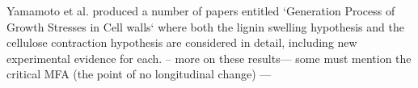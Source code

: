 Yamamoto et al. produced a number of papers entitled `Generation Process of
Growth Stresses in Cell walls` \cite{ISI:A1991FD97000001}\cite{ISI:A1992HP18200001}\cite{ISI:A1993LM28800002}\cite{ISI:A1993LE99600003}\cite{ISI:A1995QJ03000001} where both the lignin swelling
hypothesis and the cellulose contraction hypothesis are considered in detail,
including new experimental evidence for each. -- more on these results--- some
must mention the critical MFA (the point of no longitudinal change) ---